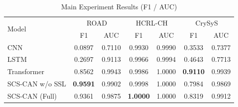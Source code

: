 \begin{table}[t]
\centering
\caption{Main Experiment Results (F1 / AUC)}
\label{tab:main}
\small
\begin{tabular}{l|cc|cc|cc}
\toprule
\multirow{2}{*}{Model} & \multicolumn{2}{c|}{ROAD} & \multicolumn{2}{c|}{HCRL-CH} & \multicolumn{2}{c}{CrySyS} \\
 & F1 & AUC & F1 & AUC & F1 & AUC \\
\midrule
CNN & 0.0897 & 0.7110 & 0.9930 & 0.9990 & 0.3533 & 0.7377 \\
LSTM & 0.2697 & 0.9113 & 0.9966 & 0.9994 & 0.4643 & 0.7713 \\
Transformer & 0.8562 & 0.9943 & 0.9986 & 1.0000 & \textbf{0.9110} & 0.9939 \\
SCS-CAN w/o SSL & \textbf{0.9591} & 0.9902 & 0.9998 & 1.0000 & 0.7984 & 0.9869 \\
SCS-CAN (Full) & 0.9361 & 0.9875 & \textbf{1.0000} & 1.0000 & 0.8319 & 0.9912 \\
\bottomrule
\end{tabular}
\end{table}